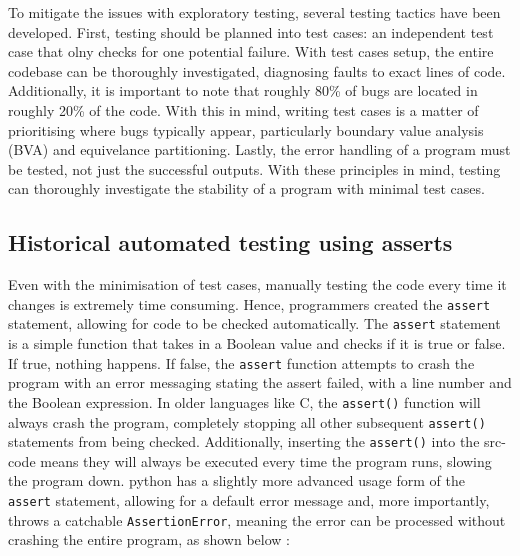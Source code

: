 \documentclass[11pt]{article}
\begin{document}
To mitigate the issues with exploratory testing, several testing tactics have been developed. First, testing should be planned into test cases: an independent test case that olny checks for one potential failure. With test cases setup, the entire codebase can be thoroughly investigated, diagnosing faults to exact lines of code. Additionally, it is important to note that roughly 80\% of bugs are located in roughly 20\% of the code. With this in mind, writing test cases is a matter of prioritising where bugs typically appear, particularly boundary value analysis (BVA) and equivelance partitioning. Lastly, the error handling of a program must be tested, not just the successful outputs. With these principles in mind, testing can thoroughly investigate the stability of a program with minimal test cases.

\subsection{Historical automated testing using asserts}

Even with the minimisation of test cases, manually testing the code every time it changes is extremely time consuming. Hence, programmers created the \texttt{assert} statement, allowing for code to be checked automatically. The \texttt{assert} statement is a simple function that takes in a Boolean value and checks if it is true or false. If true, nothing happens. If false, the \texttt{assert} function attempts to crash the program with an error messaging stating the assert failed, with a line number and the Boolean expression. In older languages like C, the \texttt{assert()} function will always crash the program, completely stopping all other subsequent \texttt{assert()} statements from being checked. Additionally, inserting the \texttt{assert()} into the \gls{src-code} means they will always be executed every time the program runs, slowing the program down. \Gls{python} has a slightly more advanced usage form of the \texttt{assert} statement, allowing for a default error message and, more importantly, throws a catchable \texttt{AssertionError}, meaning the error can be processed without crashing the entire program, as shown below \cite{python-assert}:

\inputminted[linenos=true]{python}{python_examples/assert_example.py}
\end{document}
